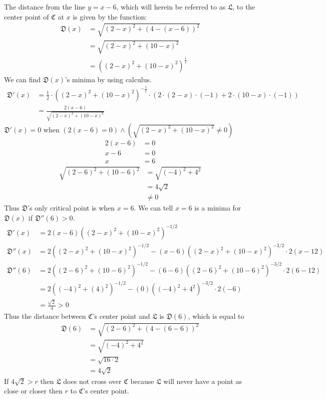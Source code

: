 \documentclass{article}
\begin{document}
The distance from the line $y=x-6$, which will herein be referred to as $\mathfrak L$, to the center point of $\mathfrak C$ at $x$ is given by the function:
\begin{align*}
\mathfrak D(x)&=\sqrt{(2-x)^2+(4-(x-6))^2}\\
&=\sqrt{(2-x)^2+(10-x)^2} \\
&=\left((2-x)^2+(10-x)^2\right)^\frac12
\end{align*}
We can find $\mathfrak D(x)$'s minima by using calculus.
\begin{align*}
\mathfrak D'(x) &= \frac12\cdot\left((2-x)^2+(10-x)^2\right)^{-\frac12} \cdot \left(2\cdot(2-x)\cdot(-1)+2\cdot(10-x)\cdot(-1)\right) \\
&= \frac{2(x-6)}{\sqrt{(2-x)^2+(10-x)^2}}
\end{align*}
$\mathfrak D'(x)=0$ when $(2(x-6)=0)\land\left(\sqrt{(2-x)^2+(10-x)^2}\not=0\right)$
\begin{align*}
2(x-6)&=0 \\
x-6&=0 \\
x&=6
\end{align*}
\begin{align*}
\sqrt{(2-6)^2+(10-6)^2}&=\sqrt{(-4)^2+4^2} \\
&=4\sqrt{2} \\
&\not=0
\end{align*}
Thus $\mathfrak D$'s only critical point is when $x=6$. We can tell $x=6$ is a minima for $\mathfrak D(x)$ if $\mathfrak D''(6)>0$.
\begin{align*}
\mathfrak D'(x)&=2(x-6)\left((2-x)^2+(10-x)^2\right)^{-1/2} \\
\mathfrak D''(x)&=2\left((2-x)^2+(10-x)^2\right)^{-1/2}-(x-6)\left((2-x)^2+(10-x)^2\right)^{-3/2}\cdot2\left(x-12\right) \\
\mathfrak D''(6)&=2\left((2-6)^2+(10-6)^2\right)^{-1/2}-(6-6)\left((2-6)^2+(10-6)^2\right)^{-3/2}\cdot2\left(6-12\right) \\
&=2\left((-4)^2+(4)^2\right)^{-1/2}-(0)\left((-4)^2+4^2\right)^{-3/2}\cdot2\left(-6\right) \\
&= \frac{\sqrt{2}}4 > 0
\end{align*}
Thus the distance between $\mathfrak C$'s center point and $\mathfrak L$ is $\mathfrak D(6)$, which is equal to
\begin{align*}
\mathfrak D(6) &= \sqrt{(2-6)^2+(4-(6-6))^2} \\
&= \sqrt{(-4)^2+4^2} \\
&= \sqrt{16\cdot2} \\
&= 4\sqrt2
\end{align*}
If $4\sqrt2>r$ then $\mathfrak L$ does not cross over $\mathfrak C$ because $\mathfrak L$ will never have a point as close or closer then $r$ to $\mathfrak C$'s center point.
\end{document}
